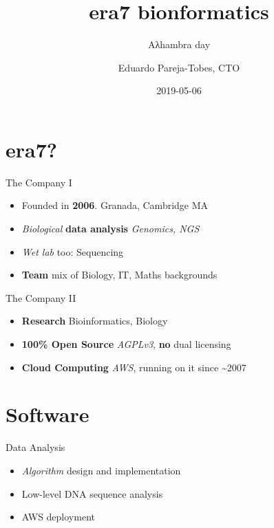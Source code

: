 \documentclass[notheorems,14pt,compress]{beamer}
\title{era7 bionformatics}
\subtitle{Aλhambra day}
\author{Eduardo Pareja-Tobes, CTO}
\date{2019-05-06}
\providecommand{\tightlist}{%
\setlength{\itemsep}{0pt}\setlength{\parskip}{0pt}}
\theoremstyle{definition}
\begin{document}
\maketitle


% 
\hypertarget{era7}{%
\section{era7?}\label{era7}}

\begin{frame}{%
\protect\hypertarget{the-company-i}{%
The Company I}}

\begin{itemize}
\tightlist
\item
  Founded in \textbf{2006}. Granada, Cambridge MA
\item
  \emph{Biological} \textbf{data analysis} \emph{Genomics, NGS}
\item
  \emph{Wet lab} too: Sequencing
\item
  \textbf{Team} mix of Biology, IT, Maths backgrounds
\end{itemize}

\end{frame}

\begin{frame}{%
\protect\hypertarget{the-company-ii}{%
The Company II}}

\begin{itemize}
\tightlist
\item
  \textbf{Research} Bioinformatics, Biology
\item
  \textbf{100\% Open Source} \emph{AGPLv3}, \textbf{no} dual licensing
\item
  \textbf{Cloud Computing} \emph{AWS}, running on it since
  \textasciitilde{}2007
\end{itemize}

\end{frame}

\hypertarget{software}{%
\section{Software}\label{software}}

\begin{frame}{%
\protect\hypertarget{data-analysis}{%
Data Analysis}}

\begin{itemize}
\tightlist
\item
  \emph{Algorithm} design and implementation
\item
  Low-level DNA sequence analysis
\item
  AWS deployment
\end{itemize}

\end{frame}
\end{document}
